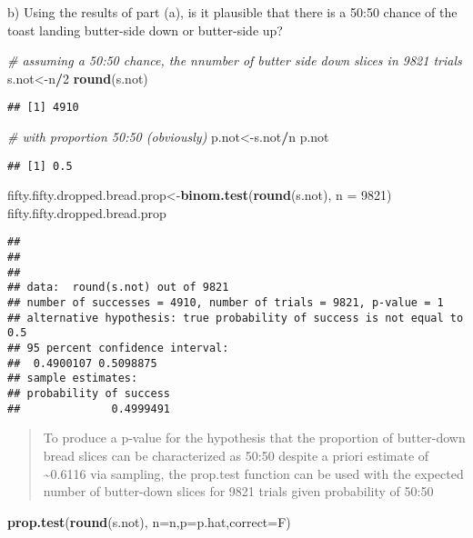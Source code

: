 \documentclass[ignorenonframetext,]{beamer}
\newenvironment{Shaded}{\begin{snugshade}}{\end{snugshade}}
\newcommand{\KeywordTok}[1]{\textcolor[rgb]{0.13,0.29,0.53}{\textbf{#1}}}
\newcommand{\DataTypeTok}[1]{\textcolor[rgb]{0.13,0.29,0.53}{#1}}
\newcommand{\DecValTok}[1]{\textcolor[rgb]{0.00,0.00,0.81}{#1}}
\newcommand{\CommentTok}[1]{\textcolor[rgb]{0.56,0.35,0.01}{\textit{#1}}}
\newcommand{\OperatorTok}[1]{\textcolor[rgb]{0.81,0.36,0.00}{\textbf{#1}}}
\newcommand{\NormalTok}[1]{#1}
\begin{document}
\begin{frame}[fragile]
\begin{block}{b) Using the results of part (a), is it plausible that
there is a 50:50 chance of the toast landing butter-side down or
butter-side up?}
\begin{Shaded}
\begin{Highlighting}[]
\CommentTok{# assuming a 50:50 chance, the nnumber of butter side down slices in 9821 trials}
\NormalTok{s.not<-n}\OperatorTok{/}\DecValTok{2}
\KeywordTok{round}\NormalTok{(s.not)}
\end{Highlighting}
\end{Shaded}

\begin{verbatim}
## [1] 4910
\end{verbatim}

\begin{Shaded}
\begin{Highlighting}[]
\CommentTok{# with proportion 50:50 (obviously)}
\NormalTok{p.not<-s.not}\OperatorTok{/}\NormalTok{n}
\NormalTok{p.not}
\end{Highlighting}
\end{Shaded}

\begin{verbatim}
## [1] 0.5
\end{verbatim}

\begin{Shaded}
\begin{Highlighting}[]
\NormalTok{fifty.fifty.dropped.bread.prop<-}\KeywordTok{binom.test}\NormalTok{(}\KeywordTok{round}\NormalTok{(s.not), }\DataTypeTok{n =} \DecValTok{9821}\NormalTok{)}
\NormalTok{fifty.fifty.dropped.bread.prop}
\end{Highlighting}
\end{Shaded}

\begin{verbatim}
## 
## 
## 
## data:  round(s.not) out of 9821
## number of successes = 4910, number of trials = 9821, p-value = 1
## alternative hypothesis: true probability of success is not equal to 0.5
## 95 percent confidence interval:
##  0.4900107 0.5098875
## sample estimates:
## probability of success 
##              0.4999491
\end{verbatim}

\begin{quote}
To produce a p-value for the hypothesis that the proportion of
butter-down bread slices can be characterized as 50:50 despite a priori
estimate of \textasciitilde{}0.6116 via sampling, the prop.test function
can be used with the expected number of butter-down slices for 9821
trials given probability of 50:50
\end{quote}

\begin{Shaded}
\begin{Highlighting}[]
\KeywordTok{prop.test}\NormalTok{(}\KeywordTok{round}\NormalTok{(s.not), }\DataTypeTok{n=}\NormalTok{n,}\DataTypeTok{p=}\NormalTok{p.hat,}\DataTypeTok{correct=}\NormalTok{F)        }
\end{Highlighting}
\end{Shaded}


\end{block}
\end{frame}
\end{document}
